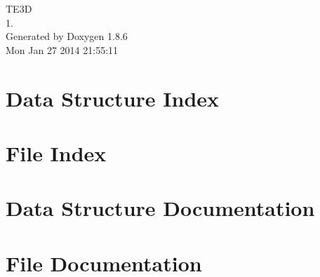 \documentclass[twoside]{book}
\newcommand{\clearemptydoublepage}{%
  \newpage{\pagestyle{empty}\cleardoublepage}%
}
\begin{document}
\hypersetup{pageanchor=false}
\begin{titlepage}
\vspace*{7cm}
\begin{center}%
{\Large T\-E3\-D \\[1ex]\large 1. }\\
\vspace*{1cm}
{\large Generated by Doxygen 1.8.6}\\
\vspace*{0.5cm}
{\small Mon Jan 27 2014 21:55:11}\\
\end{center}
\end{titlepage}
\clearemptydoublepage
\tableofcontents
\clearemptydoublepage
{}
\hypersetup{pageanchor=true}

\chapter{Data Structure Index}

\chapter{File Index}

\chapter{Data Structure Documentation}

















\chapter{File Documentation}






















\newpage
{}
{}
\printindex
\end{document}
